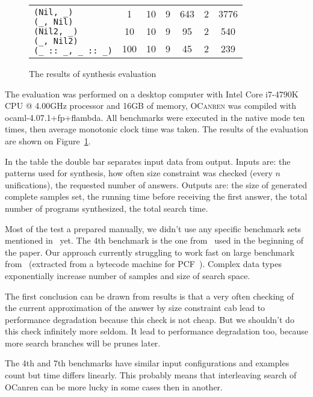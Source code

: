 \begin{figure}[t]
\begin{tabular}{|m{3cm}|cc||cccc|}
    \\
        \hline
        \multirow{3}{*}{
          \parbox{3cm}{
            \vskip2mm
\lstinline[basicstyle=\scriptsize]|(Nil, _)|\\[-1mm]
\lstinline[basicstyle=\scriptsize]|(_, Nil)|\\[-1mm]
\lstinline[basicstyle=\scriptsize]|(Nil2, _)|\\[-1mm]
\lstinline[basicstyle=\scriptsize]|(_, Nil2)|\\[-1mm]
\lstinline[basicstyle=\scriptsize]|(_ :: _, _ :: _)|}}
         & 1&10&9&643&2&3776\\[3mm]
        \cline{2-7}
      &10&10&9&95&2&540\\[3mm]
        \cline{2-7}
     &100&10&9&45&2&239                    \\ \hline
  \end{tabular}
  \caption{The results of synthesis evaluation}
  \label{fig:eval}

\end{figure}



The evaluation was performed on a desktop computer with Intel Core i7-4790K CPU @ 4.00GHz processor and 16GB of memory,
\textsc{OCanren} was compiled with \mbox{ocaml-4.07.1+fp+flambda}. All benchmarks were executed in the native mode ten times,
then average monotonic clock time was taken. The results of the evaluation are shown on Figure~\ref{fig:eval}.

In the table the double bar separates input data from output. Inputs are: the patterns used for synthesis, how often size constraint was checked (every $n$ unifications),
the requested number of answers. Outputs are: the size of generated complete samples set, the running time before receiving the first answer,
the total number of programs synthesized, the total search time.

Most of the test a prepared manually, we didn't use any specific benchmark sets mentioned in~\cite{matching2000} yet. The 4th benchmark is the one from~\cite{maranget2008}  used in the beginning of the paper. Our approach currently struggling to work fast on large
benchmark from~\cite{maranget2008} (extracted from a bytecode machine for PCF~\cite{Plotkin1977LCFCA}). Complex data types exponentially increase number of samples and size of search space.

The first conclusion can be drawn from results is that a very often checking
of the current approximation of the answer by size constraint
cab lead to performance degradation
because this check is not cheap. But we shouldn't do this check infinitely more seldom. It lead to performance degradation too,
because more search branches will be prunes later.

The 4th and 7th benchmarks have similar input configurations and examples count but time differs linearly. This probably means that interleaving search of OCanren can be more lucky in some cases then in another.

